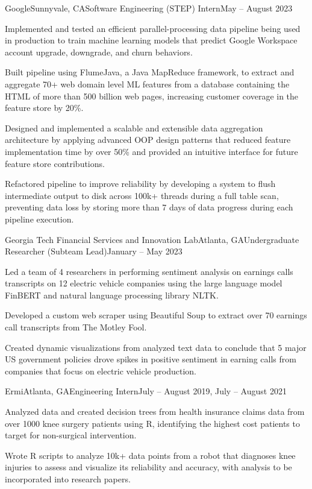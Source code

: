 \documentclass{article}
\begin{document}
\begin{flushleft}
    \begin{experience}{Google}{Sunnyvale, CA}{Software Engineering (STEP) Intern}{May -- August 2023}
        \item Implemented and tested an efficient parallel-processing data pipeline being used in production to train machine learning models that predict Google Workspace account upgrade, downgrade, and churn behaviors.
        \item Built pipeline using FlumeJava, a Java MapReduce framework, to extract and aggregate 70+ web domain level ML features from a database containing the HTML of more than 500 billion web pages, increasing customer coverage in the feature store by 20\%.
        \item Designed and implemented a scalable and extensible data aggregation architecture by applying advanced OOP design patterns that reduced feature implementation time by over 50\% and provided an intuitive interface for future feature store contributions.
        \item Refactored pipeline to improve reliability by developing a system to flush intermediate output to disk across 100k+ threads during a full table scan, preventing data loss by storing more than 7 days of data progress during each pipeline execution.
    \end{experience}

    \begin{experience}{Georgia Tech Financial Services and Innovation Lab}{Atlanta, GA}{Undergraduate Researcher (Subteam Lead)}{January -- May 2023}
        \item Led a team of 4 researchers in performing sentiment analysis on earnings calls transcripts on 12 electric vehicle companies using the large language model FinBERT and natural language processing library NLTK.
        \item Developed a custom web scraper using Beautiful Soup to extract over 70 earnings call transcripts from The Motley Fool.
        \item Created dynamic visualizations from analyzed text data to conclude that 5 major US government policies drove spikes in positive sentiment in earning calls from companies that focus on electric vehicle production.
    \end{experience}


    \begin{experience}{Ermi}{Atlanta, GA}{Engineering Intern}{July -- August 2019, July -- August 2021}
        \item Analyzed data and created decision trees from health insurance claims data from over 1000 knee surgery patients using R, identifying the highest cost patients to target for non-surgical intervention.
        \item Wrote R scripts to analyze 10k+ data points from a robot that diagnoses knee injuries to assess and visualize its reliability and accuracy, with analysis to be incorporated into research papers.
    \end{experience}


\end{flushleft}
\end{document}
